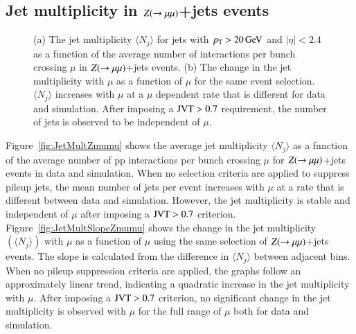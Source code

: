 \documentclass{atlasnote}
\begin{document}
\subsection{Jet multiplicity in $Z(\rightarrow\mu\mu)$+jets events}
\begin{figure}[!htbp]
 \centering
 \caption{(a) The jet multiplicity $\langle N_{j}\rangle$ for jets with $p_{\mathrm{T}}>20\,\text{Ge\hspace{-.08em}V}$ and $|\eta|<2.4$ as a function of the average number of interactions per bunch crossing $\mu$ in $Z(\rightarrow\mu\mu)$+jets events. 
          (b) The change in the jet multiplicity with $\mu$ as a function of $\mu$ for the same event selection. $\langle N_{j}\rangle$ increases with $\mu$ at a $\mu$ dependent rate that 
          is different for data and simulation. After imposing a ${\rm JVT}>0.7$ requirement, the number of jets is observed to be independent of $\mu$.
 }
 \label{fig:JetMult}
\end{figure}
Figure~\ref{fig:JetMultZmumu} shows the average jet multiplicity $\langle N_{j}\rangle$ as 
a function of the average number of pp interactions per bunch crossing $\mu$ for $Z(\rightarrow\mu\mu)$+jets events in data and simulation. 
When no selection criteria are applied to suppress pileup jets, the mean number of jets per event increases with $\mu$ at a rate that is different between data and simulation. 
However, the jet multiplicity is stable and independent of $\mu$ after imposing a ${\rm JVT}>0.7$ criterion. 
Figure~\ref{fig:JetMultSlopeZmumu} shows the change in the jet multiplicity $(\langle N_j \rangle)$ 
with $\mu$ as a function of $\mu$ using the same selection of $Z(\rightarrow\mu\mu)$+jets events. The slope is calculated from the difference in $\langle N_j \rangle$ between adjacent bins.
When no pileup suppression criteria are applied, 
the graphs follow an approximately linear trend, indicating a quadratic increase in the jet multiplicity with $\mu$. After imposing a ${\rm JVT}>0.7$ criterion, 
no significant change in the jet multiplicity is observed with $\mu$ for the full range of $\mu$ both for data and simulation.
\end{document}
